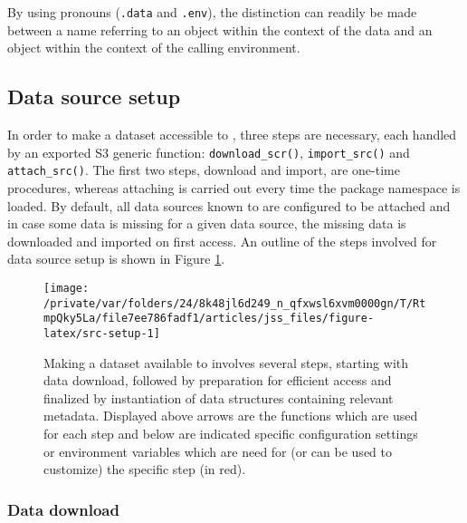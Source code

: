 \documentclass[
  notitle]{jss}
\begin{document}
By using  pronouns (\texttt{.data} and \texttt{.env}), the
distinction can readily be made between a name referring to an object
within the context of the data and an object within the context of the
calling environment.

\hypertarget{data-source-setup}{%
\subsection{Data source setup}\label{data-source-setup}}

In order to make a dataset accessible to , three steps are
necessary, each handled by an exported S3 generic function:
\texttt{download\_scr()}, \texttt{import\_src()} and
\texttt{attach\_src()}. The first two steps, download and import, are
one-time procedures, whereas attaching is carried out every time the
package namespace is loaded. By default, all data sources known to
 are configured to be attached and in case some data is
missing for a given data source, the missing data is downloaded and
imported on first access. An outline of the steps involved for data
source setup is shown in Figure \ref{fig:src-setup}.

\begin{CodeChunk}
\begin{figure}

{\centering \texttt{[image: /private/var/folders/24/8k48jl6d249\_n\_qfxwsl6xvm0000gn/T/RtmpQky5La/file7ee786fadf1/articles/jss\_files/figure-latex/src-setup-1]} 

}

\caption[Making a dataset available to  involves several steps, starting with data download, followed by preparation for efficient access and finalized by instantiation of data structures containing relevant metadata]{Making a dataset available to  involves several steps, starting with data download, followed by preparation for efficient access and finalized by instantiation of data structures containing relevant metadata. Displayed above arrows are the functions which are used for each step and below are indicated specific configuration settings or environment variables which are need for (or can be used to customize) the specific step (in red).}\label{fig:src-setup}
\end{figure}
\end{CodeChunk}

\hypertarget{data-download}{%
\subsubsection{Data download}\label{data-download}}
\end{document}
